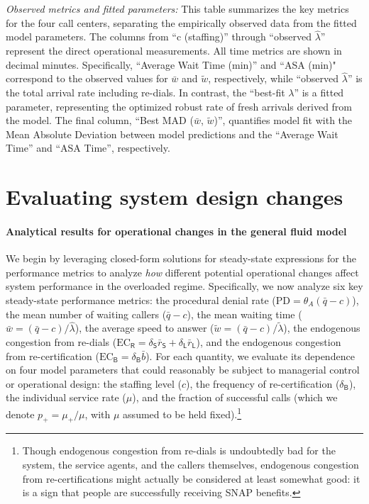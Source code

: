 \documentclass[manuscript,screen,authorversion]{acmart}
\begin{document}
\textit{Observed metrics and fitted parameters: }This table summarizes the key metrics for the four call centers, separating the empirically observed data from the fitted model parameters. The columns from ``c (staffing)'' through ``observed $\hat{\lambda}$'' represent the direct operational measurements. All time metrics are shown in decimal minutes. Specifically, ``Average Wait Time (min)'' and ``ASA (min)" correspond to the observed values for $\bar{w}$ and $\tilde{w}$, respectively, while ``observed $\hat{\lambda}$'' is the total arrival rate including re-dials. In contrast, the ``best-fit $\lambda$'' is a fitted parameter, representing the optimized robust rate of fresh arrivals derived from the model. The final column, ``Best MAD ($\bar{w}$, $\tilde{w}$)'', quantifies model fit with the Mean Absolute Deviation between model predictions and the ``Average Wait Time'' and ``ASA Time'', respectively. 





\section{Evaluating system design changes}


\paragraph{Analytical results for operational changes in the general fluid model}

We begin by leveraging closed-form solutions for steady-state expressions for the performance metrics to analyze \textit{how} different potential operational changes affect system performance in the overloaded regime. Specifically, we now analyze six key steady-state performance metrics: the procedural denial rate ($\mathrm{PD} = \theta_A (\bar q - c)$), the mean number of waiting callers ($\bar{q} - c$), the mean waiting time ($\bar w = (\bar q - c) / \hat \lambda$), the average speed to answer ($\tilde w = (\bar q - c) / \tilde \lambda$), the endogenous congestion from re-dials ($\mathrm{EC}_\mathsf{R} = \delta_\mathsf{S} \bar r_\mathsf{S} + \delta_\mathsf{L} \bar r_\mathsf{L}$), and the endogenous congestion from re-certification ($\mathrm{EC}_\mathsf{B} = \delta_\mathsf{B} \bar b$).   For each quantity, we evaluate its dependence on four model parameters that could reasonably be subject to managerial control or operational design: the staffing level ($c$), the frequency of re-certification ($\delta_\mathsf{B}$), the individual service rate ($\mu$), and the fraction of successful calls (which we denote $p_+ = \mu_+ / \mu$, with $\mu$ assumed to be held fixed).\footnote{Though endogenous congestion from re-dials is undoubtedly bad for the system, the service agents, and the callers themselves, endogenous congestion from re-certifications might actually be considered at least somewhat good: it is a sign that people are successfully receiving SNAP benefits.} 
\end{document}

